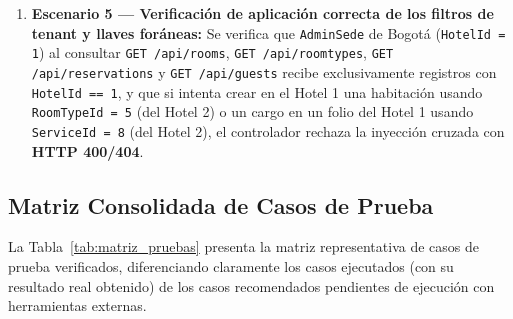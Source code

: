 \documentclass[12pt,a4paper]{article}
\begin{document}
\begin{enumerate}
    \item \textbf{Escenario 5 --- Verificaci\'on de aplicaci\'on correcta de los filtros de tenant y llaves for\'aneas:} Se verifica que \texttt{AdminSede} de Bogot\'a (\texttt{HotelId = 1}) al consultar \texttt{GET /api/rooms}, \texttt{GET /api/roomtypes}, \texttt{GET /api/reservations} y \texttt{GET /api/guests} recibe exclusivamente registros con \texttt{HotelId == 1}, y que si intenta crear en el Hotel 1 una habitaci\'on usando \texttt{RoomTypeId = 5} (del Hotel 2) o un cargo en un folio del Hotel 1 usando \texttt{ServiceId = 8} (del Hotel 2), el controlador rechaza la inyecci\'on cruzada con \textbf{HTTP 400/404}.
\end{enumerate}

\subsection{Matriz Consolidada de Casos de Prueba}
La Tabla~\ref{tab:matriz_pruebas} presenta la matriz representativa de casos de prueba verificados, diferenciando claramente los casos ejecutados (con su resultado real obtenido) de los casos recomendados pendientes de ejecuci\'on con herramientas externas.
\end{document}
